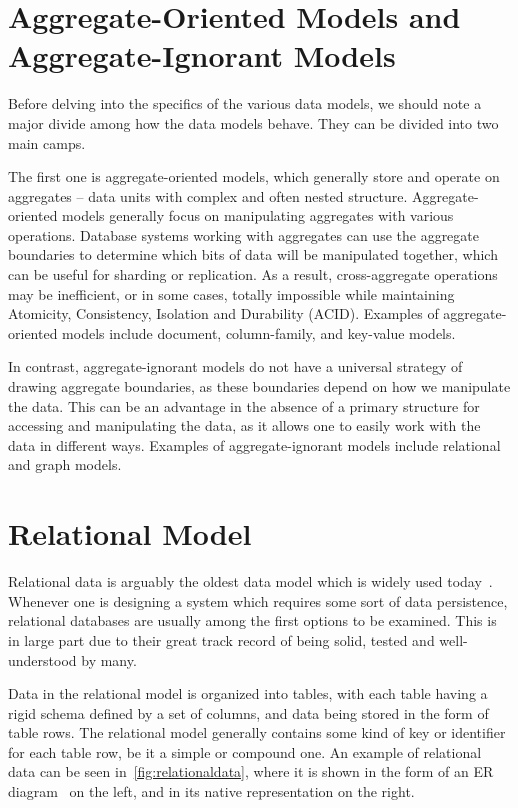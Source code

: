 \section{Aggregate-Oriented Models and Aggregate-Ignorant Models}

Before delving into the specifics of the various data models, we should note a major divide among how the data models behave.
They can be divided into two main camps.

The first one is aggregate-oriented models, which generally store and operate on aggregates -- data units with complex and often nested structure. 
Aggregate-oriented models generally focus on manipulating aggregates with various operations.
Database systems working with aggregates can use the aggregate boundaries to determine which bits of data will be manipulated together, which can be useful for sharding or replication.
As a result, cross-aggregate operations may be inefficient, or in some cases, totally impossible while maintaining Atomicity, Consistency, Isolation and Durability (ACID).
Examples of aggregate-oriented models include document, column-family, and key-value models.

In contrast, aggregate-ignorant models do not have a universal strategy of drawing aggregate boundaries, as these boundaries depend on how we manipulate the data.
This can be an advantage in the absence of a primary structure for accessing and manipulating the data, as it allows one to easily work with the data in different ways.
Examples of aggregate-ignorant models include relational and graph models.

\section{Relational Model}

Relational data is arguably the oldest data model which is widely used today~\cite{codd}.
Whenever one is designing a system which requires some sort of data persistence, relational databases are usually among the first options to be examined.
This is in large part due to their great track record of being solid, tested and well-understood by many.

Data in the relational model is organized into tables, with each table having a rigid schema defined by a set of columns, and data being stored in the form of table rows.
The relational model generally contains some kind of key or identifier for each table row, be it a simple or compound one.
An example of relational data can be seen in~\cref{fig:relationaldata}, where it is shown in the form of an ER diagram~\cite{er} on the left, and in its native representation on the right.

